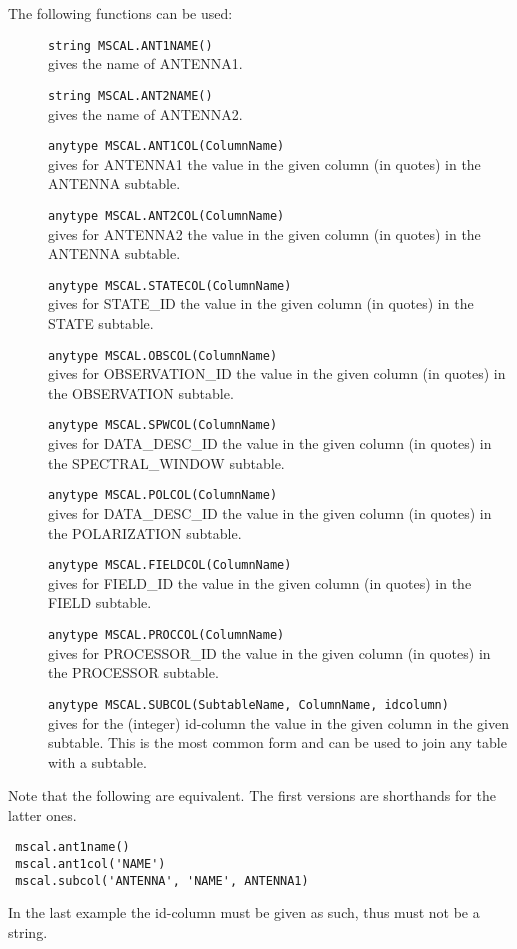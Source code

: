 The following functions can be used:
\begin{description}
  \item[] \texttt{string MSCAL.ANT1NAME()}\\
    gives the name of ANTENNA1.
  \item[] \texttt{string MSCAL.ANT2NAME()}\\
    gives the name of ANTENNA2.
  \item[] \texttt{anytype MSCAL.ANT1COL(ColumnName)}\\
    gives for ANTENNA1 the value in the given column (in quotes) in
    the ANTENNA subtable.
  \item[] \texttt{anytype MSCAL.ANT2COL(ColumnName)}\\
    gives for ANTENNA2 the value in the given column (in quotes) in
    the ANTENNA subtable.
  \item[] \texttt{anytype MSCAL.STATECOL(ColumnName)}\\
    gives for STATE\_ID the value in the given column (in quotes) in
    the STATE subtable.
  \item[] \texttt{anytype MSCAL.OBSCOL(ColumnName)}\\
    gives for OBSERVATION\_ID the value in the given column (in quotes) in
    the OBSERVATION subtable.
  \item[] \texttt{anytype MSCAL.SPWCOL(ColumnName)}\\
    gives for DATA\_DESC\_ID the value in the given column (in quotes) in
    the SPECTRAL\_WINDOW subtable.
  \item[] \texttt{anytype MSCAL.POLCOL(ColumnName)}\\
    gives for DATA\_DESC\_ID the value in the given column (in quotes) in
    the POLARIZATION subtable.
  \item[] \texttt{anytype MSCAL.FIELDCOL(ColumnName)}\\
    gives for FIELD\_ID the value in the given column (in quotes) in
    the FIELD subtable.
  \item[] \texttt{anytype MSCAL.PROCCOL(ColumnName)}\\
    gives for PROCESSOR\_ID the value in the given column (in quotes) in
    the PROCESSOR subtable.
  \item[] \texttt{anytype MSCAL.SUBCOL(SubtableName, ColumnName, idcolumn)}\\
    gives for the (integer) id-column the value in the given column in
    the given subtable. This is the most common form and can be used
    to join any table with a subtable. 
\end{description}
Note that the following are equivalent. The first versions are
shorthands for the latter ones.
\begin{verbatim}
 mscal.ant1name()
 mscal.ant1col('NAME')
 mscal.subcol('ANTENNA', 'NAME', ANTENNA1)
\end{verbatim}
In the last example the id-column must be given as such, thus must not
be a string.


